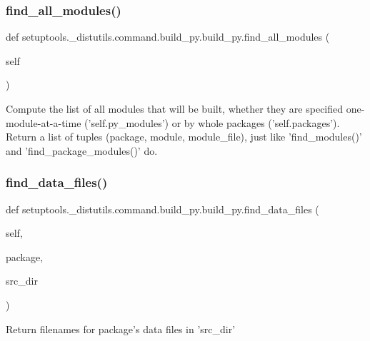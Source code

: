\subsubsection{\texorpdfstring{find\+\_\+all\+\_\+modules()}{find\_all\_modules()}}
{\footnotesize\ttfamily def setuptools.\+\_\+distutils.\+command.\+build\+\_\+py.\+build\+\_\+py.\+find\+\_\+all\+\_\+modules (\begin{DoxyParamCaption}\item[{}]{self }\end{DoxyParamCaption})}

\begin{DoxyVerb}Compute the list of all modules that will be built, whether
they are specified one-module-at-a-time ('self.py_modules') or
by whole packages ('self.packages').  Return a list of tuples
(package, module, module_file), just like 'find_modules()' and
'find_package_modules()' do.\end{DoxyVerb}
 \mbox{\label{classsetuptools_1_1__distutils_1_1command_1_1build__py_1_1build__py_ae0b1fa0973765e98ff2d0f4d56e0e807}} 
\subsubsection{\texorpdfstring{find\+\_\+data\+\_\+files()}{find\_data\_files()}}
{\footnotesize\ttfamily def setuptools.\+\_\+distutils.\+command.\+build\+\_\+py.\+build\+\_\+py.\+find\+\_\+data\+\_\+files (\begin{DoxyParamCaption}\item[{}]{self,  }\item[{}]{package,  }\item[{}]{src\+\_\+dir }\end{DoxyParamCaption})}

\begin{DoxyVerb}Return filenames for package's data files in 'src_dir'\end{DoxyVerb}
 \mbox{\label{classsetuptools_1_1__distutils_1_1command_1_1build__py_1_1build__py_aee8e63f33ecb396c42d4b130c05f29e1}} 
